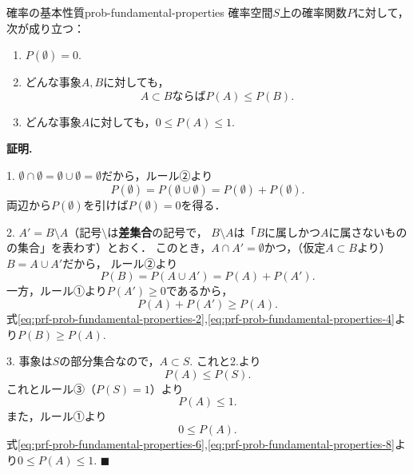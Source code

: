 \documentclass[a5j, uplatex, dvipdfmx]{jsbook}
\makeatletter
\newcommand{\proof}{\textbf{証明.}\ }
\newcommand{\qed}{$\blacksquare$}
\newcommand{\ind}[2]{\textbf{#1}\index{#2@#1}}
\makeatother
\begin{document}
    \begin{thm}{確率の基本性質}{prob-fundamental-properties}
        確率空間$S$上の確率関数$P$に対して，次が成り立つ：
        \begin{enumerate}
            \item $P(\emptyset) = 0.$
            \item どんな事象$A,B$に対しても，
            \begin{equation*}
                A\subset B ならば P(A) \leq P(B).
            \end{equation*}
            \item どんな事象$A$に対しても，$0 \leq P(A) \leq 1.$
        \end{enumerate}
    \end{thm}
    \proof

    1. $\emptyset \cap \emptyset = \emptyset \cup \emptyset = \emptyset$だから，ルール②より
    \begin{equation*}
        P(\emptyset) = P(\emptyset \cup \emptyset) = P(\emptyset) + P(\emptyset).
    \end{equation*}
    両辺から$P(\emptyset)$を引けば$P(\emptyset) = 0$を得る．

    2. $A' = B \setminus A$（記号$\setminus$は\ind{差集合}{さしゅうごう}の記号で，
    $B \setminus A$は「$B$に属しかつ$A$に属さないものの集合」を表わす）とおく．
    このとき，$A\cap A' = \emptyset$かつ，（仮定$A\subset B$より）$B=A\cup A'$だから，
    ルール②より
    \begin{equation}
        P(B) = P(A \cup A') = P(A) + P(A'). \label{eq:prf-prob-fundamental-properties-2}
    \end{equation}
    一方，ルール①より$P(A') \geq 0$であるから，
    \begin{equation}
        P(A) + P(A') \geq P(A). \label{eq:prf-prob-fundamental-properties-4}
    \end{equation}
    式\eqref{eq:prf-prob-fundamental-properties-2},\eqref{eq:prf-prob-fundamental-properties-4}より$P(B) \geq P(A).$

    3. 事象は$S$の部分集合なので，$A\subset S.$
    これと2.より
    \begin{equation*}
        P(A) \leq P(S).
    \end{equation*}
    これとルール③（$P(S)=1$）より
    \begin{equation}
        P(A) \leq 1.  \label{eq:prf-prob-fundamental-properties-6}
    \end{equation}
    また，ルール①より
    \begin{equation}
        0 \leq P(A). \label{eq:prf-prob-fundamental-properties-8}
    \end{equation}
    式\eqref{eq:prf-prob-fundamental-properties-6},\eqref{eq:prf-prob-fundamental-properties-8}より$0 \leq P(A) \leq 1.$ \qed
\end{document}
